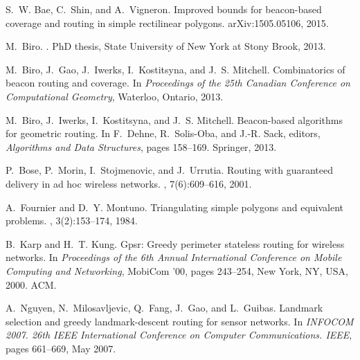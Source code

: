 \documentclass{article}
\begin{document}

\begin{thebibliography}{1}

S.~W. Bae, C.~Shin, and A.~Vigneron.
\newblock Improved bounds for beacon-based coverage and routing in simple
  rectilinear polygons.
\newblock arXiv:1505.05106, 2015.

M.~Biro.
.
\newblock PhD thesis, State University of New York at Stony Brook, 2013.

M.~Biro, J.~Gao, J.~Iwerks, I.~Kostitsyna, and J.~S. Mitchell.
\newblock Combinatorics of beacon routing and coverage.
\newblock In {\em Proceedings of the 25th Canadian Conference on Computational
  Geometry}, Waterloo, Ontario, 2013.

M.~Biro, J.~Iwerks, I.~Kostitsyna, and J.~S. Mitchell.
\newblock Beacon-based algorithms for geometric routing.
\newblock In F.~Dehne, R.~Solis-Oba, and J.-R. Sack, editors, {\em Algorithms
  and Data Structures}, pages 158--169. Springer, 2013.

P.~Bose, P.~Morin, I.~Stojmenovic, and J.~Urrutia.
\newblock Routing with guaranteed delivery in ad hoc wireless networks.
, 7(6):609--616, 2001.

A.~Fournier and D.~Y. Montuno.
\newblock Triangulating simple polygons and equivalent problems.
, 3(2):153--174, 1984.

B.~Karp and H.~T. Kung.
\newblock Gpsr: Greedy perimeter stateless routing for wireless networks.
\newblock In {\em Proceedings of the 6th Annual International Conference on
  Mobile Computing and Networking}, MobiCom '00, pages 243--254, New York, NY,
  USA, 2000. ACM.

A.~Nguyen, N.~Milosavljevic, Q.~Fang, J.~Gao, and L.~Guibas.
\newblock Landmark selection and greedy landmark-descent routing for sensor
  networks.
\newblock In {\em INFOCOM 2007. 26th IEEE International Conference on Computer
  Communications. IEEE}, pages 661--669, May 2007.

\end{thebibliography}
\end{document}
